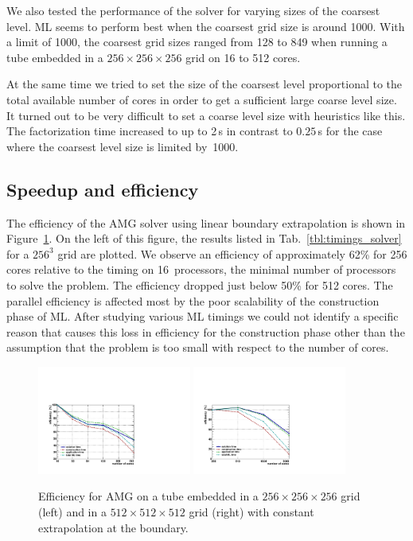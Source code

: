 We also tested the performance of the solver for varying sizes of the
coarsest level.  ML seems to perform best when the coarsest grid size is
around 1000.  With a limit of 1000, the coarsest grid sizes ranged from
128 to 849 when running a tube embedded in a $256 \times 256 \times 256$
grid on 16 to 512 cores.

At the same time we tried to set the size of the coarsest level
proportional to the total available number of cores in order to get a
sufficient large coarse level size.  It turned out to be very difficult
to set a coarse level size with heuristics like this.  The factorization
time increased to up to 2\,s in contrast to $0.25$\,s for the case where
the coarsest level size is limited by~1000.


\subsection{Speedup and efficiency}

The efficiency of the AMG solver using linear boundary extrapolation is
shown in Figure~\ref{fig:speedup}.  On the left of this figure, the
results listed in Tab.~\ref{tbl:timings_solver} for a $256^3$ grid are
plotted.  We observe an efficiency of approximately 62\% for 256 cores
relative to the timing on 16~processors, the minimal number of
processors to solve the problem.  The efficiency dropped just below 50\%
for 512 cores.  The parallel efficiency is affected most by the poor
scalability of the construction phase of ML.  After studying various ML
timings we could not identify a specific reason that causes this loss in
efficiency for the construction phase other than the assumption that the
problem is too small with respect to the number of cores.

\begin{figure}[htb] 
  \begin{center}
    \includegraphics[width=0.45\textwidth]{figures/eff_256.pdf}
    \includegraphics[width=0.45\textwidth]{figures/eff_512.pdf}
    \caption{Efficiency for AMG on a tube embedded in a
      $256\times256\times256$ grid (left) and in a
      $512\times512\times512$ grid (right) with constant extrapolation
      at the boundary.}
    \label{fig:speedup}
  \end{center} 
\end{figure}

